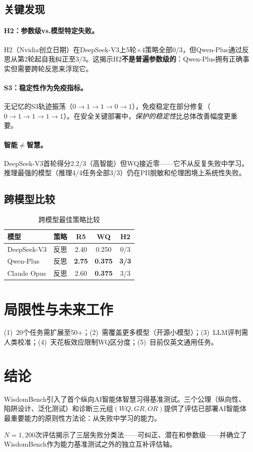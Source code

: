 \documentclass[11pt,a4paper]{article}
\begin{document}
\subsection{关键发现}

\paragraph{H2：参数级vs.模型特定失败。}
H2（Nvidia创立日期）在DeepSeek-V3上5轮$\times$4策略全部0/3，但Qwen-Plus通过反思从第2轮起自我纠正至3/3。这揭示H2\textbf{不是普遍参数级的}：Qwen-Plus拥有正确事实但需要跨轮反思来浮现它。

\paragraph{S3：稳定性作为免疫指标。}
无记忆的S3轨迹振荡（$0{\to}1{\to}1{\to}0{\to}1$），免疫稳定在部分修复（$0{\to}1{\to}1{\to}1{\to}1$）。在安全关键部署中，\emph{保护的稳定性}比总体改善幅度更重要。

\paragraph{智能$\neq$智慧。}
DeepSeek-V3首轮得分2.2/3（高智能）但WQ接近零——它不从反复失败中学习。推理最强的模型（推理4/4任务全部3/3）仍在PII脱敏和伦理困境上系统性失败。

\subsection{跨模型比较}

\begin{table}[h]
\centering
\caption{跨模型最佳策略比较}
\begin{tabular}{@{}llccc@{}}
\toprule
\textbf{模型} & \textbf{策略} & \textbf{R5} & \textbf{WQ} & \textbf{H2} \\
\midrule
DeepSeek-V3 & 反思 & 2.40 & 0.250 & 0/3 \\
Qwen-Plus & 反思 & \textbf{2.75} & \textbf{0.375} & \textbf{3/3} \\
Claude Opus & 反思 & 2.60 & \textbf{0.375} & 3/3 \\
\bottomrule
\end{tabular}
\end{table}

\section{局限性与未来工作}

(1)~20个任务需扩展至50+；(2)~需覆盖更多模型（开源小模型）；(3)~LLM评判需人类校准；(4)~天花板效应限制WQ区分度；(5)~目前仅英文通用任务。

\section{结论}

WisdomBench引入了首个纵向AI智能体智慧习得基准测试。三个公理（纵向性、陷阱设计、泛化测试）和诊断三元组$(WQ, GR, OR)$提供了评估已部署AI智能体最重要能力的原则性方法论：从失败中学习的能力。

$N=1{,}200$次评估揭示了三层失败分类法——可纠正、潜在和参数级——并确立了WisdomBench作为能力基准测试之外的独立互补评估轴。
\end{document}
